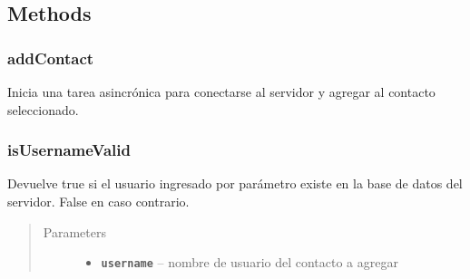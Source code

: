 \documentclass[letterpaper,10pt,english]{sphinxmanual}
\begin{document}
\subsection{Methods}
\label{Fragments/AddContactFragment:methods}

\subsubsection{addContact}
\label{Fragments/AddContactFragment:addcontact}

\begin{fulllineitems}
\label{Fragments/AddContactFragment:com.fiuba.tallerii.jobify.AddContactFragment.addContact()}
Inicia una tarea asincrónica para conectarse al servidor y agregar al contacto seleccionado.

\end{fulllineitems}



\subsubsection{isUsernameValid}
\label{Fragments/AddContactFragment:isusernamevalid}

\begin{fulllineitems}
\label{Fragments/AddContactFragment:com.fiuba.tallerii.jobify.AddContactFragment.isUsernameValid(String)}
Devuelve true si el usuario ingresado por parámetro existe en la base de datos del servidor. False en caso contrario.
\begin{quote}\begin{description}
\item[{Parameters}] \leavevmode\begin{itemize}
\item {} 
\textbf{\texttt{username}} -- nombre de usuario del contacto a agregar

\end{itemize}

\end{description}\end{quote}

\end{fulllineitems}
\end{document}

